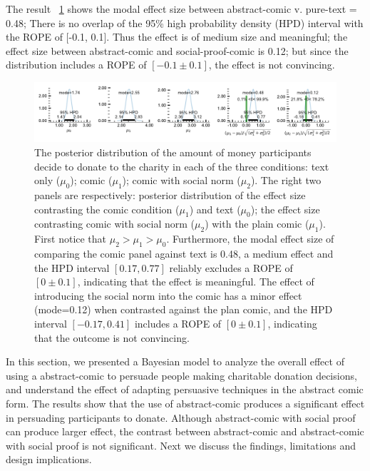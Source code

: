 The result ~\ref{fig:main-experiment2-effect} shows the modal effect size between abstract-comic v. pure-text = 0.48; There is no overlap of the 95\% high probability density (HPD) interval with the ROPE of [-0.1, 0.1]. Thus the effect is of medium size and meaningful; the effect size between abstract-comic and social-proof-comic is 0.12; but since the distribution includes a ROPE of $[-0.1 \pm 0.1]$, the effect is not convincing.


\begin{figure}[htb]
	\includegraphics[width=1\textwidth]{./hari-code/new_exp_text_v_comic_v_social.pdf}
    \caption{The posterior distribution of the amount of money participants decide to donate to the charity in each of the three conditions: text only ($\mu_0$); comic ($\mu_1$); comic with social norm ($\mu_2$). The right two panels are respectively: posterior distribution of the effect size contrasting the comic condition ($\mu_1$) and text ($\mu_0$); the effect size contrasting comic with social norm ($\mu_2$) with the plain comic ($\mu_1$). First notice that $\mu_2 > \mu_1 > \mu_0$. Furthermore, the modal effect size of comparing the comic panel against text is 0.48, a medium effect and the HPD interval $[0.17, 0.77]$ reliably excludes a ROPE of $[0 \pm 0.1]$, indicating that the effect is meaningful. The effect of introducing the social norm into the comic has a minor effect (mode=0.12) when contrasted against the plan comic, and the HPD interval $[-0.17, 0.41]$ includes a ROPE of $[0 \pm 0.1]$, indicating that the outcome is not convincing.}
	\label{fig:main-experiment2-effect}
\end{figure}


In this section, we presented a Bayesian model to analyze the overall effect of using a abstract-comic to persuade people making charitable donation decisions, and understand the effect of adapting persuasive techniques in the abstract comic form. The results show that the use of abstract-comic produces a significant effect in persuading participants to donate. Although abstract-comic with social proof can produce larger effect, the contrast between abstract-comic and abstract-comic with social proof is not significant. Next we discuss the findings, limitations and design implications.

